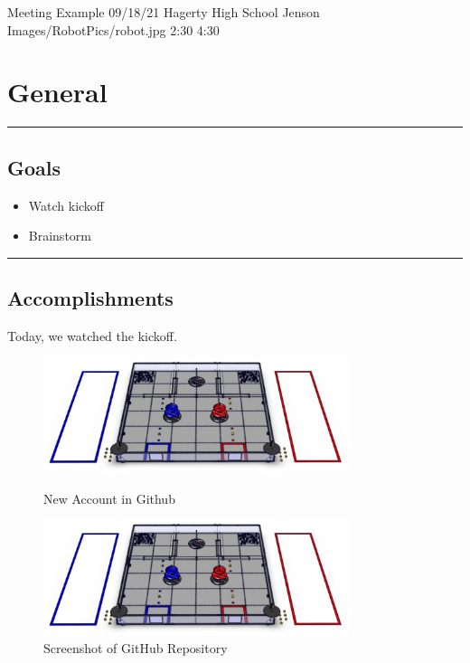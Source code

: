 \insertmeeting 
	{Meeting Example} 
	{09/18/21}
	{Hagerty High School}
	{Jenson}
	{Images/RobotPics/robot.jpg}
	{2:30}
  {4:30}
	
\section*{General}
\noindent\hfil\rule{\textwidth}{.4pt}\hfil
\subsection*{Goals}
\begin{itemize}
    \item Watch kickoff
    \item Brainstorm   

\end{itemize} 

\noindent\hfil\rule{\textwidth}{.4pt}\hfil

\subsection*{Accomplishments}
Today, we watched the kickoff.
 

\begin{figure}[ht]
\centering
\begin{minipage}[b]{.50\textwidth}
  \centering
  \includegraphics[width=0.8\textwidth]{Meetings/September/09-18-21/field.png}
  \caption{New Account in Github}
  \label{fig:pic1}
\end{minipage}%
\hfill%
\begin{minipage}[b]{.50\textwidth}
  \centering
  \includegraphics[width=0.8\textwidth]{Meetings/September/09-18-21/field.png}
  \caption{Screenshot of GitHub Repository}
  \label{fig:pic2}
\end{minipage}
\end{figure}

